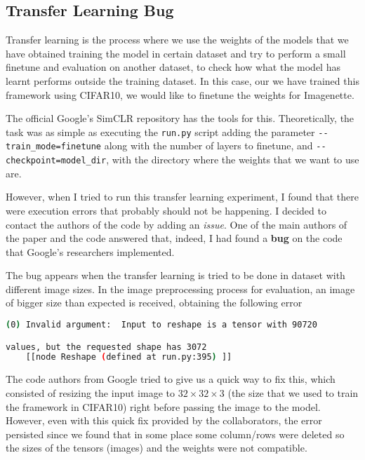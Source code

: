 \subsection{Transfer Learning Bug}

Transfer learning is the process where we use the weights of the models that we have obtained training the model in certain dataset and try to perform a small finetune and evaluation on another dataset, to check how what the model has learnt performs outside the training dataset. In this case, our we have trained this framework using CIFAR10, we would like to finetune the weights for Imagenette.

The official Google's SimCLR repository has the tools for this. Theoretically, the task was as simple as executing the \lstinline{run.py} script adding the parameter \lstinline{--train_mode=finetune} along with the number of layers to finetune,  and \lstinline{--checkpoint=model_dir}, with the directory where the weights that we want to use are.

However, when I tried to run this transfer learning experiment, I found that there were execution errors that probably should not be happening. I decided to contact the authors of the code by adding an \emph{issue}\footnotemark. One of the main authors of the paper and the code answered that, indeed, I had found a \textbf{bug} on the code that Google's researchers implemented.



The bug appears when the transfer learning is tried to be done in dataset with different image sizes. In the image preprocessing process for evaluation, an image of bigger size than expected is received, obtaining the following error 
\begin{lstlisting}[language=bash,caption={Error obtained in transfer learning.}]
(0) Invalid argument:  Input to reshape is a tensor with 90720

values, but the requested shape has 3072
    [[node Reshape (defined at run.py:395) ]]
\end{lstlisting}

The code authors from Google tried to give us a quick way to fix this, which consisted of resizing the input image to $32\times 32 \times 3$ (the size that we used to train the framework in CIFAR10) right before passing the image to the model. However, even with this quick fix provided by the collaborators, the error persisted since we found that in some place some column/rows were deleted so the sizes of the tensors (images) and the weights were not compatible.


